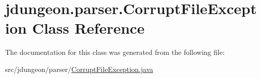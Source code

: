 \hypertarget{classjdungeon_1_1parser_1_1_corrupt_file_exception}{
\section{jdungeon.parser.CorruptFileException Class Reference}
\label{classjdungeon_1_1parser_1_1_corrupt_file_exception}
}


The documentation for this class was generated from the following file:\begin{DoxyCompactItemize}
\item 
src/jdungeon/parser/\hyperlink{_corrupt_file_exception_8java}{CorruptFileException.java}\end{DoxyCompactItemize}
